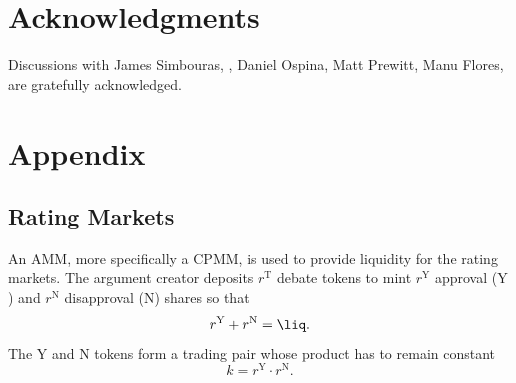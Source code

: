 \documentclass[%
aip,
amsmath,amssymb,
reprint,%
unsortedaddress,
nofootinbib
]{revtex4-2}
\newcommand{\T}{\text{T}}
\newcommand{\Y}{\text{Y}}
\newcommand{\N}{\text{N}}
\begin{document}
\section*{Acknowledgments}


Discussions
with 
James Simbouras,
,
Daniel Ospina,
Matt Prewitt, 
Manu Flores,
are gratefully acknowledged.


\section*{Appendix}

\subsection*{Rating Markets}\label{sec:RatingMarkets}
An \ac{AMM}, more specifically a \ac{CPMM}, is used to provide liquidity for the rating markets.
The argument creator deposits $r^\T$ debate tokens 
to mint 
$r^\Y$ approval ($\Y$) and 
$r^\N$ disapproval ($\N$) shares
so that
\begin{equation}
	r^\Y+r^\N = \liq.
\end{equation}
The $\Y$ and $\N$ tokens form a trading pair
whose product has to remain constant
\begin{equation}
	k = r^\Y\cdot r^\N.
\end{equation}
\end{document}
